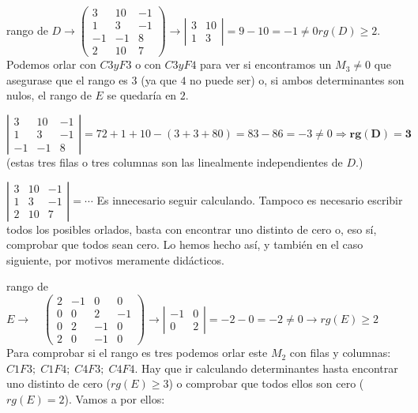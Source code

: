 \begin{proofw}
\noindent  * rango de $D \to  \left( \begin{matrix} \boxed{3}&\boxed{10}&-1 \\ \boxed{1}&\boxed{3}&-1 \\ -1&-1&8\\2&10&7  \end{matrix} \right) \to \left| \begin{matrix} 3&10\\1&3 \end{matrix} \right|=9-10=-1\neq 0 rg(D)\ge 2$. Podemos orlar con $C3 y F3$ o con $C3 y F4$ para ver si encontramos un $M_3 \neq 0$ que asegurase que el rango es $3$ (ya que $4$ no puede ser) o, si ambos determinantes son nulos, el rango de $E$ se quedaría en $2$.

\noindent $\left| \begin{matrix} \boxed{3}&\boxed{10}&-1\\\boxed{1}&\boxed{3}&-1\\ -1&-1&8 \end{matrix} \right|= 72+1+10-(3+3+80)=83-86=-3 \neq 0 \Rightarrow \boldsymbol{rg(D)=3}$ \textcolor{gris}{(estas tres filas o tres columnas son las linealmente independientes de $D$.)}

\noindent $\left| \begin{matrix} \boxed{3}&\boxed{10}&-1\\\boxed{1}&\boxed{3}&-1\\ 2&10&7 \end{matrix} \right|= \cdots$ Es innecesario seguir calculando. \textcolor{gris}{Tampoco es necesario escribir todos los posibles orlados, basta con encontrar uno distinto de cero o, eso sí, comprobar que todos sean cero. Lo hemos hecho así, y también en el caso siguiente, por motivos meramente didácticos.}



\noindent  * rango de $E \to \quad \left( \begin{matrix} 2&\boxed{-1}&\boxed{0}&0\\0&\boxed{0}&\boxed{2}&-1\\0&2&-1&0\\2&0&-1&0  \end{matrix} \right)  \to \left| \begin{matrix} -1&0\\0&2 \end{matrix} \right|=-2-0=-2\neq 0 \to rg(E)\ge 2$ Para comprobar si el rango es tres podemos orlar este $M_2$ con filas y columnas: $C1F3; \; C1F4; \; C4F3; \; C4F4$. Hay que ir calculando determinantes hasta encontrar uno distinto de cero ($rg(E)\ge 3$) o comprobar que todos ellos son cero ($rg(E)=2$). Vamos a por ellos:


\end{proofw}

